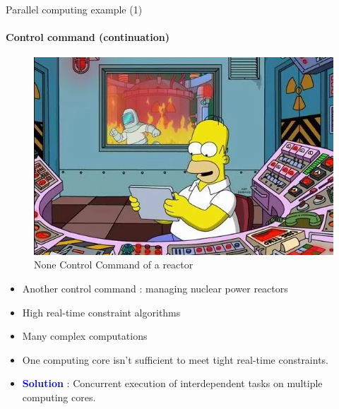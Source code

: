 \documentclass[compress,10pt,aspectratio=169]{beamer}
\begin{document}
\begin{frame}[fragile]{Parallel computing example (1)}
    \framesubtitle{Control command (continuation)}
    \small
    \begin{multicols}{2}
        \begin{figure}[h]      
            \includegraphics[width=\linewidth]{../images/NuclearPlantSimpson.png}
            \caption{None Control Command of a reactor}
        \end{figure}
    \begin{itemize}
        \item Another control command : managing nuclear power reactors
        \item High real-time constraint algorithms
        \item Many complex computations
        \item One computing core isn't sufficient to meet tight real-time constraints.
        \item \textcolor{blue}{\bf Solution} : Concurrent execution of interdependent tasks on multiple computing cores.
    \end{itemize}
\end{multicols}
\end{frame}
\end{document}
